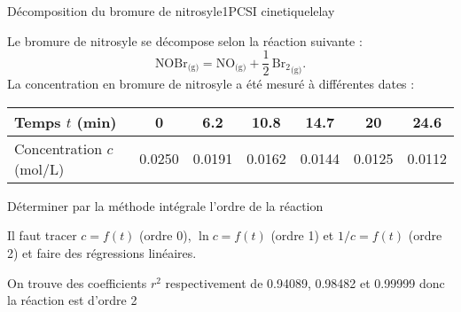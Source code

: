
\begin{exercise}{Décomposition du bromure de nitrosyle}{1}{PCSI}
{cinetique}{lelay}

Le bromure de nitrosyle se décompose selon la réaction suivante :
$$
\text{NOBr}_\text{(g)} = \text{NO}_\text{(g)} + \frac12\, {\text{Br}_2}_\text{(g)}.
$$
La concentration en bromure de nitrosyle a été mesuré à différentes dates :
\begin{table}[H]
    \centering
    \begin{tabular}{l|c|c|c|c|c|c}
        Temps $t$ (min)             &  0    & 6.2   & 10.8    & 14.7  & 20    & 24.6   \\
        \hline
        Concentration $c$ (mol/L)   & 0.0250    & 0.0191  & 0.0162    & 0.0144    & 0.0125    & 0.0112
    \end{tabular}
\end{table}

\begin{questions}

    \question Déterminer par la méthode intégrale l'ordre de la réaction
    
\end{questions}
\end{exercise}

\begin{solution}
\begin{questions}

    \question Il faut tracer $c = f(t)$ (ordre 0), $\ln c = f(t)$ (ordre 1) et $1/c = f(t)$ (ordre 2) et faire des régressions linéaires.
    
    On trouve des coefficients $r^2$ respectivement de 0.94089, 0.98482 et 0.99999 donc la réaction est d'ordre 2
    
\end{questions}
\end{solution}


